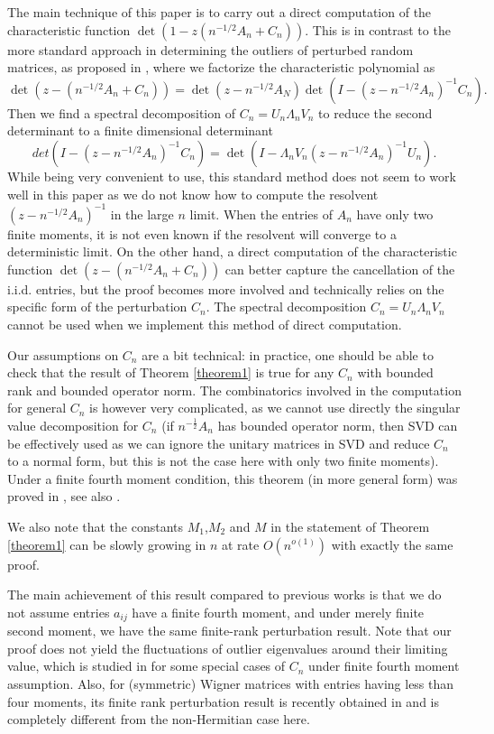 \documentclass[12pt, reqno]{amsart}
\theoremstyle{definition}
\theoremstyle{remark}
\numberwithin{equation}{section}
\begin{document}
The main technique of this paper is to carry out a direct computation of the characteristic function $\det(1-z(n^{-1/2}A_n+C_n))$. This is in contrast to the more standard approach in determining the outliers of perturbed random matrices, as proposed in \cite{tao2013outliers}, where we factorize the characteristic polynomial as 
$$
\det(z-(n^{-1/2}A_n+C_n))=\det(z-n^{-1/2}A_N)\det(I-(z-n^{-1/2}A_n)^{-1}C_n).
$$ Then we find a spectral decomposition of $C_n=U_n\Lambda_n V_n$ to reduce the second determinant to a finite dimensional determinant 
$$
det(I-(z-n^{-1/2}A_n)^{-1}C_n)=\det(I-\Lambda_nV_n(z-n^{-1/2}A_n)^{-1}U_n).
$$ While being very convenient to use, this standard method does not seem to work well in this paper as we do not know how to compute the resolvent $(z-n^{-1/2}A_n)^{-1}$ in the large $n$ limit. When the entries of $A_n$ have only two finite moments, it is not even known if the resolvent will converge to a deterministic limit. On the other hand, a direct computation of the characteristic function $\det(z-(n^{-1/2}A_n+C_n))$ can better capture the cancellation of the i.i.d. entries, but the proof becomes more involved and technically relies on the specific form of the perturbation $C_n$. The spectral decomposition $C_n=U_n\Lambda_n V_n$ cannot be used when we implement this method of direct computation.




Our assumptions on $C_n$ are a bit technical: in practice, one should be able to check that the result of Theorem \ref{theorem1} is true for any $C_n$ with bounded rank and bounded operator norm. The combinatorics involved in the computation for general $C_n$ is however very complicated, as we cannot use directly the singular value decomposition for $C_n$ (if $n^{-\frac{1}{2}}A_n$ has bounded operator norm, then SVD can be effectively used as we can ignore the unitary matrices in SVD and reduce $C_n$ to a normal form, but this is not the case here with only two finite moments). Under a finite fourth moment condition, this theorem (in more general form) was proved in \cite{tao2013outliers}, see also \cite{bordenave2016outlier}.

We also note that the constants $M_1$,$M_2$ and $M$ in the statement of Theorem \ref{theorem1} can be slowly growing in $n$ at rate $O(n^{o(1)})$ with exactly the same proof.

The main achievement of this result compared to previous works is that we do not assume entries $a_{ij}$ have a finite fourth moment, and under merely finite second moment, we have the same finite-rank perturbation result. Note that our proof does not yield the fluctuations of outlier eigenvalues around their limiting value, which is studied in \cite{bordenave2016outlier} for some special cases of $C_n$ under finite fourth moment assumption. Also, for (symmetric) Wigner matrices with entries having less than four moments, its finite rank perturbation result is recently obtained in \cite{diaconu2022finite} and is completely different from the non-Hermitian case here.
\end{document}
